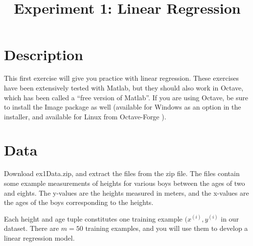 \documentclass[10pt,a4paper]{article}
\begin{document}
\title{Experiment 1: Linear Regression}

\maketitle
  
\section{Description}
%
  This first exercise will give you practice with linear regression. These exercises have been extensively tested with Matlab, but they should also work in Octave, which has been called a ``free version of Matlab''. If you are using Octave, be sure to install the Image package as well (available for Windows as an option in the installer, and available for Linux from Octave-Forge ).



\section{Data}
%
  Download ex1Data.zip, and extract the files from the zip file. The files contain some example measurements of heights for various boys between the ages of two and eights. The y-values are the heights measured in meters, and the x-values are the ages of the boys corresponding to the heights.

  Each height and age tuple constitutes one training example  $(x^{(i)}, y^{(i)}$ in our dataset. There are $m = 50$ training examples, and you will use them to develop a linear regression model.
\end{document}

